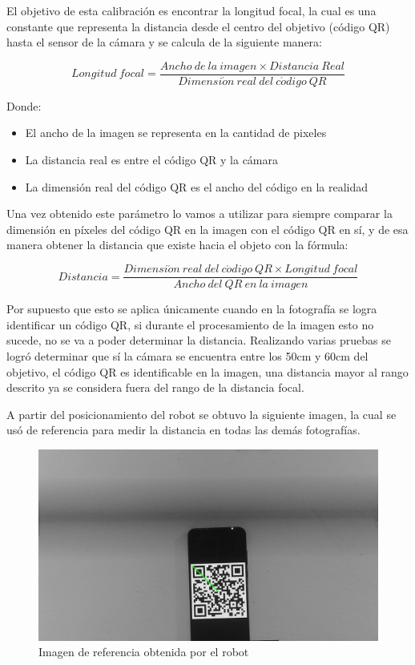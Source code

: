 El objetivo de esta calibración es encontrar la longitud focal, la cual es una constante que representa la distancia desde el centro del objetivo (código QR) hasta el sensor de la cámara y se calcula de la siguiente manera:

\begin{equation}
   Longitud\ focal = \frac{Ancho\ de\ la\ imagen\times Distancia\ Real}{Dimensi\acute{o}n\ real\ del\ c\acute{o}digo\ QR}
   \label{ec:logitud_focal}
\end{equation}

Donde:
\begin{itemize}
   \item El ancho de la imagen se representa en la cantidad de pixeles
   \item La distancia real es entre el código QR y la cámara
   \item La dimensión real del código QR es el ancho del código en la realidad
\end{itemize}

Una vez obtenido este parámetro lo vamos a utilizar para siempre comparar la dimensión en píxeles del código QR en la imagen con el código QR en sí, y de esa manera obtener la distancia que existe hacia el objeto con la fórmula:

\begin{equation}
   Distancia = \frac{Dimensi\acute{o}n\ real\ del\ c\acute{o}digo\ QR \times Longitud\ focal}{Ancho\ del\ QR\ en\ la\ imagen}
   \label{ec:distancia_qr}
\end{equation}

Por supuesto que esto se aplica únicamente cuando en la fotografía se logra identificar un código QR, si durante el procesamiento de la imagen esto no sucede, no se va a poder determinar la distancia. Realizando varias pruebas se logró determinar que sí la cámara se encuentra entre los 50cm y 60cm del objetivo, el código QR es identificable en la imagen, una distancia mayor al rango descrito ya se considera fuera del rango de la distancia focal.

A partir del posicionamiento del robot se obtuvo la siguiente imagen, la cual se usó de referencia para medir la distancia en todas las demás fotografías.
\begin{figure}[H]
   \centering
   \includegraphics[width=0.8\linewidth]{images/img_centro.jpg}
   \caption{Imagen de referencia obtenida por el robot}
   \label{fig:img_centro}
\end{figure}


